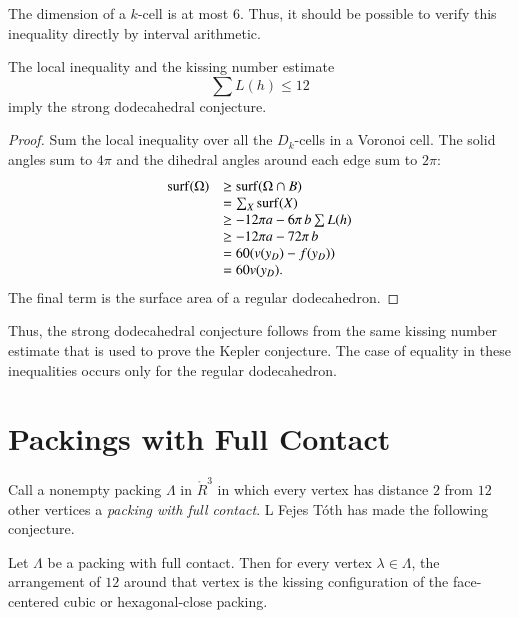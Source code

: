 \begin{note} %
The dimension of a $k$-cell is at most $6$.  Thus, it should be possible to verify this inequality directly by interval arithmetic.
\end{note}

\begin{lemma}  The local inequality and the kissing number estimate
$$
\sum L(h) \le 12
$$
imply the strong dodecahedral conjecture.
\end{lemma}

\begin{proof} 
Sum the local inequality over all the $D_k$-cells in a Voronoi cell.  The solid angles sum to $4\pi$ and the dihedral angles around each edge sum to $2\pi$:
$$
\begin{array}{lll}
{\operatorname{surf}}(\Omega) &\ge {\operatorname{surf}}(\Omega\cap B)\\
&=\sum_X {\operatorname{surf}}(X)\\
&\ge -12\pi a - 6\pi\, b  \sum L(h)\\
&\ge -12\pi a - 72\pi\, b\\
&= 60 (v(y_D) - f(y_D))\\
&= 60 v(y_D).\\
\end{array}
$$
The final term is the surface area of a regular dodecahedron.
\end{proof}

Thus, the strong dodecahedral conjecture follows from the same kissing number estimate that is used to prove the Kepler conjecture.  The case of equality in these inequalities occurs only for the regular dodecahedron.

\section{Packings with Full Contact}



Call a nonempty packing $\Lambda$ in $\ring{R}^3$ in which every vertex has distance $2$ from  $12$ other vertices a {\it packing with full contact}. L Fejes T\'oth has made the following conjecture.
%
%
%

\begin{conjecture}  Let $\Lambda$ be a packing with full contact.  Then for every vertex $\lambda\in\Lambda$, the arrangement of $12$ around that vertex is the kissing configuration of the face-centered cubic or hexagonal-close packing. 
\end{conjecture}
%
%
%

